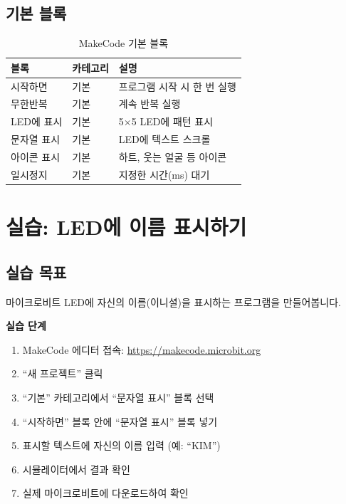 \documentclass[11pt, a4paper]{article}
\begin{document}
\subsection{기본 블록}

\begin{table}[H]
\centering
\begin{tabularx}{\textwidth}{l l X}
\toprule
\textbf{블록} & \textbf{카테고리} & \textbf{설명} \\
\midrule
시작하면 & 기본 & 프로그램 시작 시 한 번 실행 \\
무한반복 & 기본 & 계속 반복 실행 \\
LED에 표시 & 기본 & 5×5 LED에 패턴 표시 \\
문자열 표시 & 기본 & LED에 텍스트 스크롤 \\
아이콘 표시 & 기본 & 하트, 웃는 얼굴 등 아이콘 \\
일시정지 & 기본 & 지정한 시간(ms) 대기 \\
\bottomrule
\end{tabularx}
\caption{MakeCode 기본 블록}
\end{table}

\section{실습: LED에 이름 표시하기}

\subsection{실습 목표}

마이크로비트 LED에 자신의 이름(이니셜)을 표시하는 프로그램을 만들어봅니다.

\begin{activity}
\textbf{실습 단계}

\begin{enumerate}
    \item MakeCode 에디터 접속: \url{https://makecode.microbit.org}
    \item ``새 프로젝트'' 클릭
    \item ``기본'' 카테고리에서 ``문자열 표시'' 블록 선택
    \item ``시작하면'' 블록 안에 ``문자열 표시'' 블록 넣기
    \item 표시할 텍스트에 자신의 이름 입력 (예: ``KIM'')
    \item 시뮬레이터에서 결과 확인
    \item 실제 마이크로비트에 다운로드하여 확인
\end{enumerate}
\end{activity}
\end{document}
